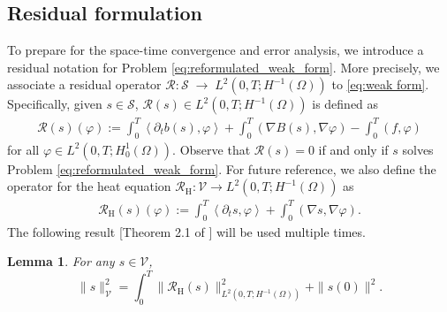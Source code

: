 \documentclass[review,11pt]{article}
\numberwithin{equation}{section}
\def \Om {\Omega}
\def \calV {\mathcal{V}}
\def \calR {\mathcal{R}}
\def \resH {{\calR}_{\mathrm{H}}}
\def \calS {\mathcal{S}}
\newtheorem{lemma}{Lemma}[section]
\begin{document}
\subsection{Residual formulation}\label{subsec:Residual-formulation}
To prepare for the space-time convergence and error analysis, we introduce a residual notation for Problem \ref{eq:reformulated_weak_form}. More precisely, we associate a residual operator $\calR : \calS 
\;\longrightarrow\; L^2(0,T;H^{-1}(\Om))$ to \eqref{eq:weak form}. Specifically, given $s \in \mathcal{S}$, $\calR(s) \in L^2(0,T;H^{-1}(\Om))$ is defined as
\begin{align}\label{eq:residual}
   \calR(s)( \varphi) := \int_0^T\!\left\langle \partial_t b(s), \varphi \right\rangle 
  + \int_0^T\!(\nabla B(s), \nabla \varphi)
  - \int_0^T\!( f, \varphi )
\end{align}
for all $\varphi \in L^2(0,T;H_0^1(\Omega))$. Observe that $\calR(s)=0$ if and only if $s$ solves Problem \ref{eq:reformulated_weak_form}. For future reference, we also define the operator for the heat equation $\resH:\calV\to L^2(0,T;H^{-1}(\Om))$ as 
\begin{align}\label{eq:resH_def}
        \resH(s)(\varphi)   
  := \int_0^T\!\left\langle \partial_t s, \varphi \right\rangle 
  + \int_0^T\!(\nabla s, \nabla \varphi).
\end{align}
The following result [Theorem 2.1 of \cite{ErnSmearsVohralik2017}] will be used multiple times.
\begin{lemma}\label{lemma_2.2} For any $s\in \calV$,
\[\|s\|_{\calV}^2 =\int_0^T \|\resH(s)\|^2_{L^2(0,T;H^{-1}(\Omega))} + \|s(0)\|^2.\]\label{lemma:resH}
\end{lemma}
\vspace{-15mm}
\end{document}
